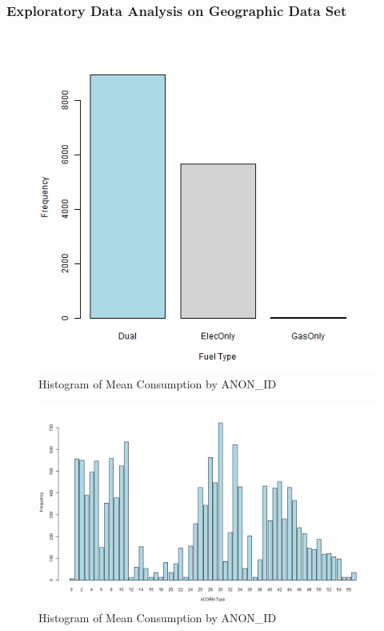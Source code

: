         \subsubsection{Exploratory Data Analysis on Geographic Data Set}
        
        \begin{figure}[H]
        \centering     
        \includegraphics[width=1\textwidth]{Figures/EDA_images/fuel_table.png}
        \caption{Histogram of Mean Consumption by ANON\_ID}
        \label{fig:Daily Consumption}
        \end{figure}
        
        \begin{figure}[H]
        \centering     
        \includegraphics[width=1\textwidth]{Figures/EDA_images/acorn_type.png}
        \caption{Histogram of Mean Consumption by ANON\_ID}
        \label{fig:Daily Consumption}
        \end{figure}
        
